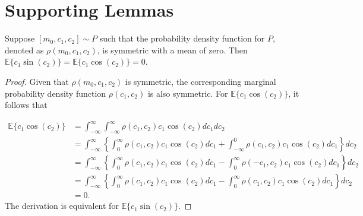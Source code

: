 \newpage
\clearpage


\appendix

\section{Supporting Lemmas} \label{app:A}
\begin{lemma} \label{lem:1}
Suppose $[m_0, c_1, c_2]\sim P$ such that the probability density function for $P$, denoted as $\rho(m_0, c_1, c_2)$, is symmetric with a mean of zero. Then $\mathbb{E}\{c_{1}\sin(c_{2})\} = \mathbb{E}\{c_1\cos(c_2)\} = 0$.
\end{lemma}

\begin{proof}
Given that $\rho(m_0, c_1, c_2)$ is symmetric, the corresponding marginal probability density function $\rho(c_1, c_2)$ is also symmetric. For $\mathbb{E}\{c_1\cos(c_2)\}$, it follows that

\begin{align*}
    \mathbb{E}\{c_1\cos(c_2)\} &= \int_{-\infty}^{\infty}\int_{-\infty}^{\infty} \rho(c_1, c_2)c_1\cos(c_2) dc_1 dc_2 \\
    &= \int_{-\infty}^{\infty}\left\{\int_{0}^{\infty} \rho(c_1, c_2)c_1\cos(c_2) dc_1 + \int_{-\infty}^{0} \rho(c_1, c_2)c_1\cos(c_2) dc_1\right\} dc_2 \\
    &= \int_{-\infty}^{\infty}\left\{\int_{0}^{\infty} \rho(c_1, c_2)c_1\cos(c_2) dc_1 - \int_{0}^{\infty} \rho(-c_1, c_2)c_1\cos(c_2) dc_1\right\} dc_2 \\
    &= \int_{-\infty}^{\infty}\left\{\int_{0}^{\infty} \rho(c_1, c_2)c_1\cos(c_2) dc_1 - \int_{0}^{\infty} \rho(c_1, c_2)c_1\cos(c_2) dc_1\right\} dc_2 \\
    &= 0.
\end{align*}
The derivation is equivalent for $\mathbb{E}\{c_{1}\sin(c_{2})\}$.
\end{proof}

